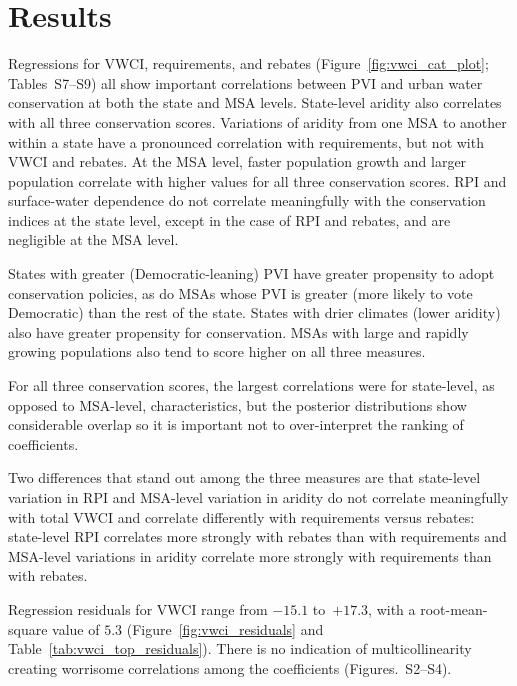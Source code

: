 \documentclass[draft,linenumbers]{agujournal}
\begin{document}
\section{Results}
Regressions for VWCI, requirements, and rebates
(Figure~\ref{fig:vwci_cat_plot}; Tables~S7--S9)
all show
important correlations between PVI and
urban water conservation at both the state and MSA levels.
State-level aridity also correlates with
all three conservation scores.
Variations of aridity from one MSA to another within a state have a pronounced
correlation with
requirements, but
not with
VWCI and rebates.
At the MSA level, faster population growth and larger population
correlate
with higher values for all three conservation scores.
RPI and surface-water dependence
do not correlate meaningfully with the
conservation indices
at the state level,
except in the case of RPI and rebates,
and are negligible at the MSA level.
%
%


States with greater (Democratic-leaning) PVI have
greater propensity
to adopt conservation policies, as do MSAs whose PVI is greater
(more likely to vote Democratic) than the rest of the state.
States with drier climates (lower aridity) also have
greater propensity for conservation.
MSAs with large and rapidly growing populations also
tend to score higher on all three measures.

For all three conservation scores, the largest
correlations
were for state-level,
as opposed to MSA-level, characteristics, but the posterior distributions show
considerable overlap so it is important not to over-interpret the ranking of
coefficients.

Two differences that stand out among the three measures are that state-level
variation in RPI and MSA-level variation in aridity
do not correlate meaningfully with
total VWCI and
correlate differently with
requirements versus rebates:
state-level RPI
correlates more strongly with rebates
than with requirements
and MSA-level variations in aridity
correlate more strongly with requirements
than with rebates.

%
%

Regression residuals for VWCI range
from $-15.1$
to~$+17.3$,
with a root-mean-square value of
$5.3$
(Figure~\ref{fig:vwci_residuals} and Table~\ref{tab:vwci_top_residuals}).
There is no indication of multicollinearity creating worrisome correlations
among the coefficients (Figures.~S2--S4).
%
%

%
%
\end{document}
